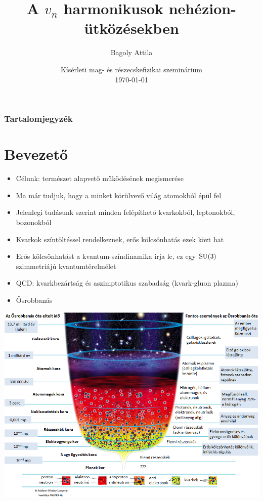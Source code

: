 \documentclass{beamer}
\title{A $v_n$ harmonikusok nehézion-ütközésekben}
\author{Bagoly Attila}
\date[\today]{Kísérleti mag- és részecskefizikai szeminárium\\ \today}
\institute{ELTE TTK}
\begin{document}
\begin{frame}
  \titlepage
\end{frame}

\begin{frame}
\frametitle{Tartalomjegyzék}
\tableofcontents
\end{frame}

\section{Bevezető}
\begin{frame}
\begin{itemize}
\item Célunk: természet alapvető működésének megismerése
\item Ma már tudjuk, hogy a minket körülvevő világ atomokból épül fel
\item Jelenlegi tudásunk szerint minden felépíthető kvarkokból, leptonokból, bozonokból
\item Kvarkok színtöltéssel rendelkeznek, erős kölcsönhatás ezek közt hat
\item Erős kölcsönhatást a kvantum-színdinamika írja le, ez egy ${\rm SU}(3)$ szimmetriájú kvantumtérelmélet
\item QCD: kvarkbezártság és aszimptotikus szabadság (kvark-gluon plazma)
\item Ősrobbanás
\end{itemize}
\end{frame}

\begin{frame}
\includegraphics[scale=0.5]{pic/osrobbanas}
\end{frame}
\end{document}
